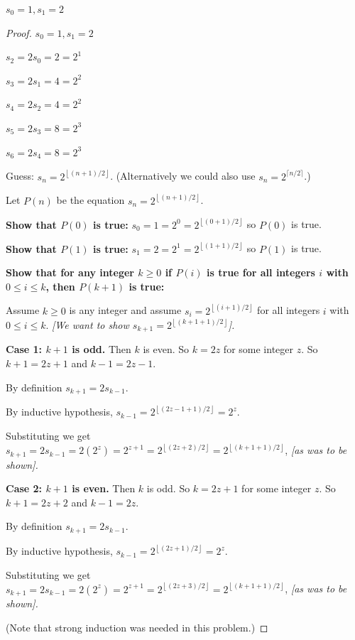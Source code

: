 \documentclass[14pt]{extarticle}
\newcommand{\dps}{\displaystyle}
\newcommand{\floor}[1]{{\left\lfloor#1\right\rfloor}}
\newcommand{\ceil}[1]{{\lceil#1\rceil}}
\begin{document}
\(s_0 = 1, s_1 = 2\)

\begin{proof}
\(s_0 = 1, s_1 = 2\)

\(s_2 = 2s_0 = 2 = 2^1\)

\(s_3 = 2s_1 = 4 = 2^2\)

\(s_4 = 2s_2 = 4 = 2^2\)

\(s_5 = 2s_3 = 8 = 2^3\)

\(s_6 = 2s_4 = 8 = 2^3\)

Guess: \(\dps s_n = 2^{\floor{(n+1)/2}}\). (Alternatively we could also use \(\dps s_n = 2^{\ceil{n/2}}\).)

Let \(P(n)\) be the equation \(\dps s_n = 2^{\floor{(n+1)/2}}\).

{\bf Show that $P(0)$ is true:} \(\dps s_0 = 1 = 2^0 = 2^{\floor{(0+1)/2}}\) so $P(0)$ is true.

{\bf Show that $P(1)$ is true:} \(\dps s_1 = 2 = 2^1 = 2^{\floor{(1+1)/2}}\) so $P(1)$ is true.

{\bf Show that for any integer \(k \geq 0\) if $P(i)$ is true for all integers $i$ with \(0 \leq i \leq k\), then
$P(k+1)$ is true:}

Assume \(k \geq 0\) is any integer and assume \(\dps s_i = 2^{\floor{(i+1)/2}}\) for all integers $i$ with 
\(0 \leq i \leq k\). {\it [We want to show \(\dps s_{k+1} = 2^{\floor{(k+1+1)/2}}\)].}

{\bf Case 1: $k+1$ is odd.} Then $k$ is even. So $k = 2z$ for some integer $z$. So $k+1 = 2z+1$ and $k-1 = 2z-1$.

By definition \(\dps s_{k+1} = 2s_{k-1}\).

By inductive hypothesis, \(\dps s_{k-1} = 2^{\floor{(2z-1+1)/2}} = 2^{z}\).

Substituting we get \(\dps s_{k+1} = 2s_{k-1} = 2(2^z) = 2^{z+1} = 2^{\floor{(2z+2)/2}} = 2^{\floor{(k+1+1)/2}}\), 
{\it [as was to be shown].}

{\bf Case 2: $k+1$ is even.} Then $k$ is odd. So $k = 2z+1$ for some integer $z$. So $k+1 = 2z+2$ and $k-1 = 2z$.

By definition \(s_{k+1} = 2s_{k-1}\).

By inductive hypothesis, \(s_{k-1} = 2^{\floor{(2z+1)/2}} = 2^z\).

Substituting we get \(\dps s_{k+1} = 2s_{k-1} = 2(2^z) = 2^{z+1} = 2^{\floor{(2z+3)/2}} = 2^{\floor{(k+1+1)/2}}\),
{\it [as was to be shown].}

(Note that strong induction was needed in this problem.)
\end{proof}
\end{document}
